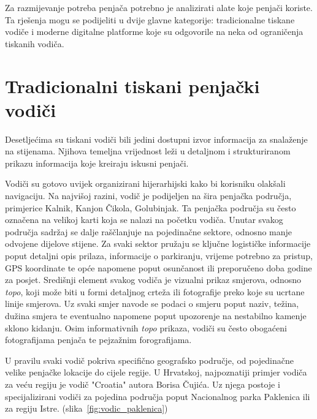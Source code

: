 
Za razmijevanje potreba penjača potrebno je analizirati alate koje penjači koriste. Ta rješenja mogu se podijeliti u dvije glavne kategorije: tradicionalne tiskane vodiče i moderne digitalne platforme koje su odgovorile na neka od ograničenja tiskanih vodiča.

\section{Tradicionalni tiskani penjački vodiči}

Desetljećima su tiskani vodiči bili jedini dostupni izvor informacija za snalaženje na stijenama. Njihova temeljna vrijednost leži u detaljnom i strukturiranom prikazu informacija koje kreiraju iskusni penjači. 

Vodiči su gotovo uvijek organizirani hijerarhijski kako bi korisniku olakšali navigaciju. Na najvišoj razini, vodič je podijeljen na šira penjačka područja, primjerice Kalnik, Kanjon Čikola, Golubinjak. Ta penjačka područja su često označena na velikoj karti koja se nalazi na početku vodiča. Unutar svakog područja sadržaj se dalje raščlanjuje na pojedinačne sektore, odnosno manje odvojene dijelove stijene. Za svaki sektor pružaju se ključne logističke informacije poput detaljni opis prilaza, informacije o parkiranju, vrijeme potrebno za pristup, GPS koordinate te opće napomene poput osunčanost ili preporučeno doba godine za posjet. 
Središnji element svakog vodiča je vizualni prikaz smjerova, odnosno \textit{topo}, koji može biti u formi detaljnog crteža ili fotografije preko koje su ucrtane linije smjerova. Uz svaki smjer navode se podaci o smjeru poput naziv, težina, dužina smjera te eventualno napomene poput upozorenje na nestabilno kamenje sklono kidanju. Osim informativnih \textit{topo} prikaza, vodiči su često obogaćeni fotografijama penjača te pejzažnim forografijama. 


U pravilu svaki vodič pokriva specifično geografsko područje, od pojedinačne velike penjačke lokacije do cijele regije. U Hrvatskoj, najpoznatiji primjer vodiča za veću regiju je vodič "Croatia" autora Borisa Čujića. Uz njega postoje i specijalizirani vodiči za pojedina područja poput Nacionalnog parka Paklenica ili za regiju Istre. (slika~\ref{fig:vodic_paklenica})

